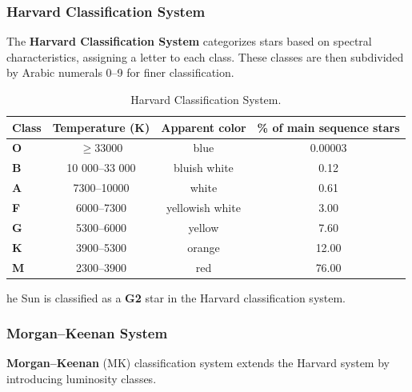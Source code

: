 \subsubsection{Harvard Classification System}

The \textbf{Harvard Classification System} \parencite{Cannon1918} categorizes stars based on spectral characteristics, assigning a letter to each class.
These classes are then subdivided by Arabic numerals 0--9 for finer classification.

\begin{table}[H]
    \centering
    \scriptsize
    \renewcommand{\arraystretch}{1.1}

    \begin{tabularx}{\textwidth}{X c c c}
        \toprule
        \textbf{Class} & \textbf{Temperature (K)} & \textbf{Apparent color} & \textbf{\% of main sequence stars} \tabularnewline
        \midrule
        \textbf{O} & $\geq \num{33000}$              & blue            & 0.00003 \tabularnewline
        \textbf{B} & 10 000--33 000     & bluish white    & \num{0.12}    \tabularnewline
        \textbf{A} & 7300--10000      & white           & \num{0.61}    \tabularnewline
        \textbf{F} & 6000--7300       & yellowish white & \num{3.00}    \tabularnewline
        \textbf{G} & 5300--6000       & yellow          & \num{7.60}     \tabularnewline
        \textbf{K} & 3900--5300       & orange          & \num{12.00}   \tabularnewline
        \textbf{M} & 2300--3900       & red             & \num{76.00}   \tabularnewline
        \bottomrule
    \end{tabularx}

    \caption[Harvard Classification System]{Harvard Classification System.}
    \label{tab:02_harvard_classification}
\end{table}

\FloatBarrier

he Sun is classified as a \textbf{G2} star in the Harvard classification system.

\subsubsection{Morgan--Keenan System}

\textbf{Morgan--Keenan} (MK) classification \parencite{Morgan1973} system extends the Harvard system by introducing luminosity classes.

